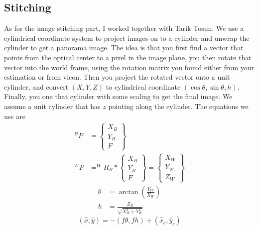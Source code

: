\documentclass[twoside]{article}
\begin{document}
\begin{multicols}{2}
\subsection{Stitching}
As for the image stitching part, I worked together with Tarik Tosun. We use a cylindrical coordinate system to project images on to a cylinder and unwrap the cylinder to get a panorama image. The idea is that you first find a vector that points from the optical center to a pixel in the image plane, you then rotate that vector into the world frame, using the rotation matrix you found either from your estimation or from vicon. Then you project the rotated vector onto a unit cylinder, and convert $(X,Y,Z)$ to cylindrical coordinate $(\cos\theta, \sin\theta, h)$. Finally, you one that cylinder with some scaling to get the final image. We assume a unit cylinder that has $z$ pointing along the cylinder. The equations we use are
\begin{align}
^BP &= \begin{Bmatrix}X_B \\ Y_B\\ F\end{Bmatrix} \\
^WP &= ^WR_B * \begin{Bmatrix}X_B \\ Y_B\\ F\end{Bmatrix} = \begin{Bmatrix}X_W \\ Y_W\\ Z_W\end{Bmatrix}
\end{align}
\begin{align}
\theta &= \arctan(\frac{Y_W}{X_W})\\
h &= \frac{Z_B}{\sqrt{X_W^2+Y_W^2}}
\end{align}
\begin{equation}
(\hat{x}, \hat{y}) = -(f\theta, fh) + (\hat{x}_c, \hat{y}_c)
\end{equation}



\end{multicols}
\end{document}
